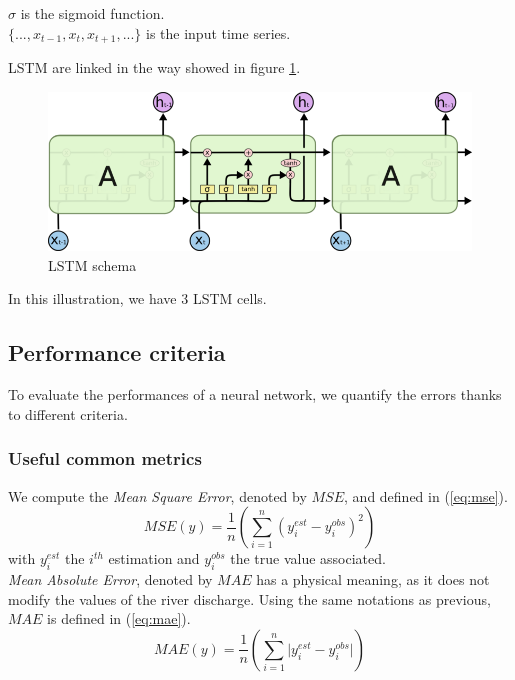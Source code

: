\noindent $\sigma$ is the sigmoid function.\\
$\{..., x_{t-1}, x_t, x_{t+1}, ... \}$ is the input time series. 

LSTM are linked in the way showed in figure \ref{fig:schema lstm}. \\

\begin{figure}[H]
    \centering
    \includegraphics{Graph/schema_lstm.png}
    \caption{LSTM schema}
    \label{fig:schema lstm}
\end{figure}

In this illustration, we have 3 LSTM cells. 


\subsection{Performance criteria}

To evaluate the performances of a neural network, we quantify the errors thanks to different criteria.

\subsubsection{Useful common metrics}
 We compute the \textit{Mean Square Error}, denoted by $MSE$, and defined in (\ref{eq:mse}).
\begin{equation}
    MSE(y) = {\frac{1}{n} \left( \sum^n_{i=1}(y^{est}_i - y^{obs}_i)^2 \right)}
    \label{eq:mse}
\end{equation}
with $y^{est}_i$ the $i^{th}$ estimation and $y^{obs}_i$ the true value associated.\\

\textit{Mean Absolute Error}, denoted by $MAE$ has a physical meaning, as it does not modify the values of the river discharge. Using the same notations as previous, $MAE$ is defined in (\ref{eq:mae}).
\begin{equation}
    MAE(y) = {\frac{1}{n} \left( \sum^n_{i=1}\lvert y^{est}_i - y^{obs}_i\rvert \right)}
    \label{eq:mae}
\end{equation}

